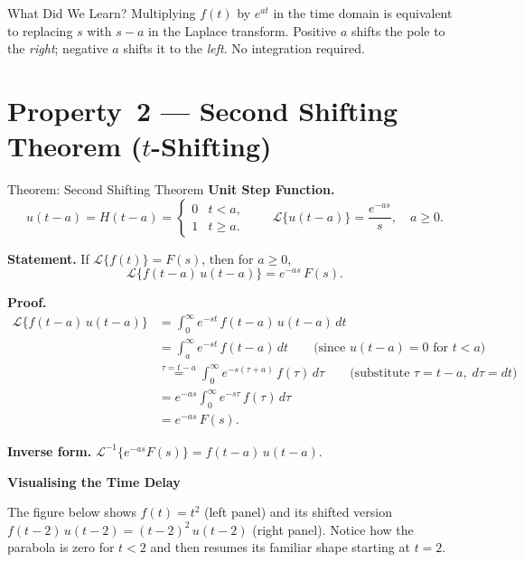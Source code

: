 \documentclass[12pt,a4paper]{article}
\begin{document}
\begin{learnbox}{What Did We Learn?}
Multiplying $f(t)$ by $e^{at}$ in the time domain is equivalent to replacing $s$ with $s-a$
in the Laplace transform. Positive $a$ shifts the pole to the \emph{right}; negative $a$
shifts it to the \emph{left}. No integration required.
\end{learnbox}

\section{Property~2 --- Second Shifting Theorem ($t$-Shifting)}

\begin{infobox}{Theorem: Second Shifting Theorem}
\textbf{Unit Step Function.}
\[
  u(t-a) = H(t-a) =
  \begin{cases}
    0 & t < a, \\
    1 & t \geq a.
  \end{cases}
  \qquad \mathcal{L}\{u(t-a)\} = \frac{e^{-as}}{s}, \quad a \geq 0.
\]

\textbf{Statement.} If $\mathcal{L}\{f(t)\} = F(s)$, then for $a \geq 0$,
\[
  \mathcal{L}\{f(t-a)\,u(t-a)\} = e^{-as}\,F(s).
\]

\textbf{Proof.}
\begin{align*}
  \mathcal{L}\{f(t-a)\,u(t-a)\}
  &= \int_0^{\infty} e^{-st}\,f(t-a)\,u(t-a)\,dt \\
  &= \int_a^{\infty} e^{-st}\,f(t-a)\,dt \qquad \text{(since } u(t-a)=0 \text{ for } t<a\text{)} \\
  &\overset{\tau = t-a}{=} \int_0^{\infty} e^{-s(\tau+a)}\,f(\tau)\,d\tau \qquad \text{(substitute } \tau = t-a,\; d\tau = dt\text{)} \\
  &= e^{-as} \int_0^{\infty} e^{-s\tau}\,f(\tau)\,d\tau \\
  &= e^{-as}\,F(s).
\end{align*}

\textbf{Inverse form.} $\mathcal{L}^{-1}\{e^{-as}F(s)\} = f(t-a)\,u(t-a)$.
\end{infobox}

\textbf{Visualising the Time Delay}

The figure below shows $f(t) = t^2$ (left panel) and its shifted version
$f(t-2)\,u(t-2) = (t-2)^2\,u(t-2)$ (right panel). Notice how the parabola is zero for
$t < 2$ and then resumes its familiar shape starting at $t = 2$.
\end{document}
